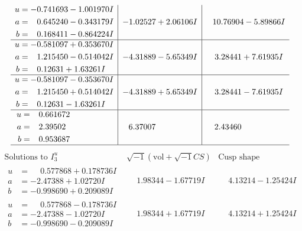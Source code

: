 \documentclass[1p]{elsarticle_modified}
\theoremstyle{definition}
\newcommand{\I}{\sqrt{-1}}
\begin{document}
$$\begin{array}{c|c|c}
\begin{aligned}
u &= -0.741693 - 1.001970 I \\
a &= \phantom{-}0.645240 - 0.343179 I \\
b &= \phantom{-}0.168411 - 0.864224 I\end{aligned}
 & -1.02527 + 2.06106 I & \phantom{-}10.76904 - 5.89866 I \\ \hline\begin{aligned}
u &= -0.581097 + 0.353670 I \\
a &= \phantom{-}1.215450 - 0.514042 I \\
b &= \phantom{-}0.12631 + 1.63261 I\end{aligned}
 & -4.31889 - 5.65349 I & \phantom{-}3.28441 + 7.61935 I \\ \hline\begin{aligned}
u &= -0.581097 - 0.353670 I \\
a &= \phantom{-}1.215450 + 0.514042 I \\
b &= \phantom{-}0.12631 - 1.63261 I\end{aligned}
 & -4.31889 + 5.65349 I & \phantom{-}3.28441 - 7.61935 I \\ \hline\begin{aligned}
u &= \phantom{-}0.661672\phantom{ +0.000000I} \\
a &= \phantom{-}2.39502\phantom{ +0.000000I} \\
b &= \phantom{-}0.953687\phantom{ +0.000000I}\end{aligned}
 & \phantom{-}6.37007\phantom{ +0.000000I} & \phantom{-}2.43460\phantom{ +0.000000I}\\
 \hline 
 \end{array}$$\newpage$$\begin{array}{c|c|c}  
\text{Solutions to }I^u_{3}& \I (\text{vol} + \sqrt{-1}CS) & \text{Cusp shape}\\
 \hline 
\begin{aligned}
u &= \phantom{-}0.577868 + 0.178736 I \\
a &= -2.47388 + 1.02720 I \\
b &= -0.998690 + 0.209089 I\end{aligned}
 & \phantom{-}1.98344 - 1.67719 I & \phantom{-}4.13214 - 1.25424 I \\ \hline\begin{aligned}
u &= \phantom{-}0.577868 - 0.178736 I \\
a &= -2.47388 - 1.02720 I \\
b &= -0.998690 - 0.209089 I\end{aligned}
 & \phantom{-}1.98344 + 1.67719 I & \phantom{-}4.13214 + 1.25424 I \\ \hline\begin{aligned}

\end{aligned}
\end{array}$$
\end{document}
